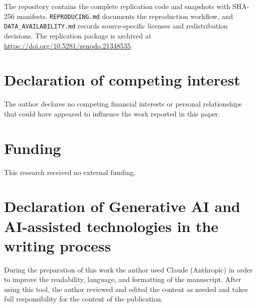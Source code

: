 \documentclass[11pt,a4paper]{article}
\begin{document}
The repository contains the complete replication code and snapshots with SHA-256 manifests. \texttt{REPRODUCING.md} documents the reproduction workflow, and \texttt{DATA\_AVAILABILITY.md} records source-specific licenses and redistribution decisions. The replication package is archived at \url{https://doi.org/10.5281/zenodo.21348535}.

\section*{Declaration of competing interest}

The author declares no competing financial interests or personal relationships that could have appeared to influence the work reported in this paper.

\section*{Funding}

This research received no external funding.

\section*{Declaration of Generative AI and AI-assisted technologies in the writing process}

During the preparation of this work the author used Claude (Anthropic) in order to improve the readability, language, and formatting of the manuscript. After using this tool, the author reviewed and edited the content as needed and takes full responsibility for the content of the publication.
\end{document}
